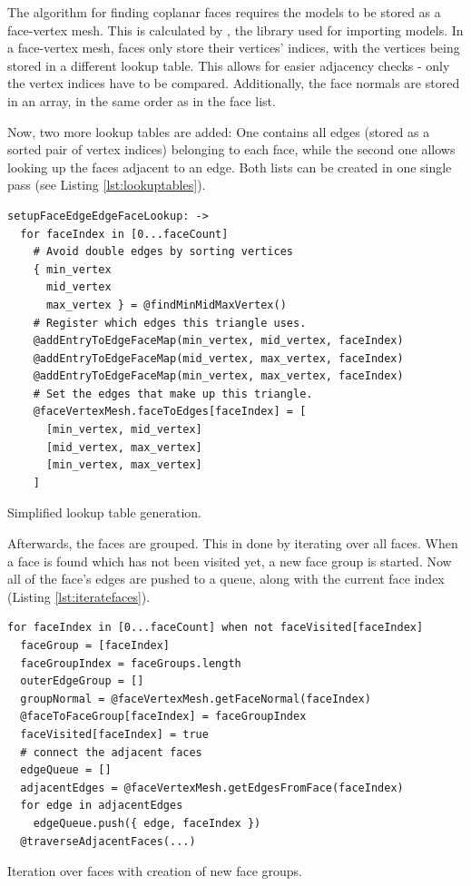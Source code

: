 \documentclass[../ClassicThesis.tex]{subfiles}
\begin{document}
The algorithm for finding coplanar faces requires the models to be stored as a face-vertex mesh. This is calculated by \meshlib, the library used for importing models. In a face-vertex mesh, faces only store their vertices' indices, with the vertices being stored in a different lookup table. This allows for easier adjacency checks - only the vertex indices have to be compared. Additionally, the face normals are stored in an array, in the same order as in the face list.

Now, two more lookup tables are added: One contains all edges (stored as a sorted pair of vertex indices) belonging to each face, while the second one allows looking up the faces adjacent to an edge. Both lists can be created in one single pass (see Listing \ref{lst:lookuptables}). 

\begin{listing}[ht]
\begin{verbatim}
setupFaceEdgeEdgeFaceLookup: ->
  for faceIndex in [0...faceCount]
    # Avoid double edges by sorting vertices
    { min_vertex
      mid_vertex
      max_vertex } = @findMinMidMaxVertex()
    # Register which edges this triangle uses.
    @addEntryToEdgeFaceMap(min_vertex, mid_vertex, faceIndex)
    @addEntryToEdgeFaceMap(mid_vertex, max_vertex, faceIndex)
    @addEntryToEdgeFaceMap(min_vertex, max_vertex, faceIndex)
    # Set the edges that make up this triangle.
    @faceVertexMesh.faceToEdges[faceIndex] = [
      [min_vertex, mid_vertex]
      [mid_vertex, max_vertex]
      [min_vertex, max_vertex]
    ]
\end{verbatim}
\caption{Simplified lookup table generation.}
\label{lst:lookuptables}
\end{listing}

Afterwards, the faces are grouped. This in done by iterating over all faces. When a face is found which has not been visited yet, a new face group is started. Now all of the face's edges are pushed to a queue, along with the current face index (Listing \ref{lst:iteratefaces}).

\begin{listing}[ht]
\begin{verbatim}
for faceIndex in [0...faceCount] when not faceVisited[faceIndex]
  faceGroup = [faceIndex]
  faceGroupIndex = faceGroups.length
  outerEdgeGroup = []
  groupNormal = @faceVertexMesh.getFaceNormal(faceIndex)
  @faceToFaceGroup[faceIndex] = faceGroupIndex
  faceVisited[faceIndex] = true
  # connect the adjacent faces
  edgeQueue = []
  adjacentEdges = @faceVertexMesh.getEdgesFromFace(faceIndex)
  for edge in adjacentEdges
    edgeQueue.push({ edge, faceIndex })
  @traverseAdjacentFaces(...)
\end{verbatim}
\caption{Iteration over faces with creation of new face groups.}
\label{lst:iteratefaces}
\end{listing}
\end{document}
